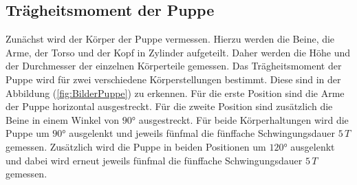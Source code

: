 \subsection{Trägheitsmoment der Puppe}
\label{sec:TragheitPuppe}
%
Zunächst wird der Körper der Puppe vermessen. Hierzu werden die Beine, die Arme, der Torso und der Kopf in Zylinder
aufgeteilt. Daher werden die Höhe und der Durchmesser der einzelnen Körperteile gemessen. Das Trägheitsmoment der Puppe wird 
für zwei verschiedene Körperstellungen bestimmt. Diese sind in der Abbildung (\ref{fig:BilderPuppe}) zu erkennen. Für die erste Position sind die Arme der Puppe horizontal ausgestreckt. 
Für die zweite Position sind zusätzlich die Beine in einem Winkel von $90°$ ausgestreckt. Für beide Körperhaltungen wird 
die Puppe um $90°$ ausgelenkt und jeweils fünfmal die fünffache Schwingungsdauer $5\,T$ gemessen. Zusätzlich wird die Puppe 
in beiden Positionen um $120°$ ausgelenkt und dabei wird erneut jeweils fünfmal die fünffache Schwingungsdauer $5\,T$ gemessen. 
%
